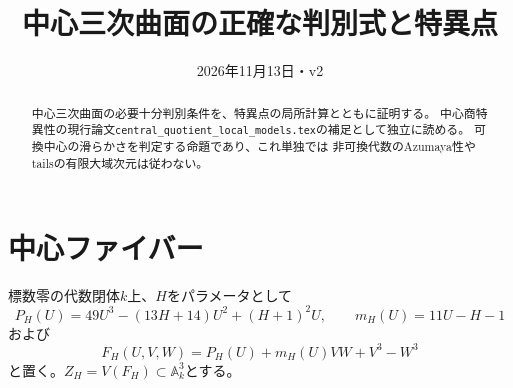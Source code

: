 \documentclass[a4paper,11pt]{ltjsarticle}
\title{中心三次曲面の正確な判別式と特異点}
\author{}
\date{2026年11月13日・v2}
\begin{document}
\maketitle
\begin{abstract}
中心三次曲面の必要十分判別条件を、特異点の局所計算とともに証明する。
中心商特異性の現行論文\texttt{central\_quotient\_local\_models.tex}の補足として独立に読める。
可換中心の滑らかさを判定する命題であり、これ単独では
非可換代数のAzumaya性やtailsの有限大域次元は従わない。
\end{abstract}
\section{中心ファイバー}
標数零の代数閉体$k$上、$H$をパラメータとして
\[
P_H(U)=49U^3-(13H+14)U^2+(H+1)^2U,\qquad
m_H(U)=11U-H-1
\]
および
\[
F_H(U,V,W)=P_H(U)+m_H(U)VW+V^3-W^3
\]
と置く。$Z_H=V(F_H)\subset\mathbb A^3_k$とする。
\end{document}

